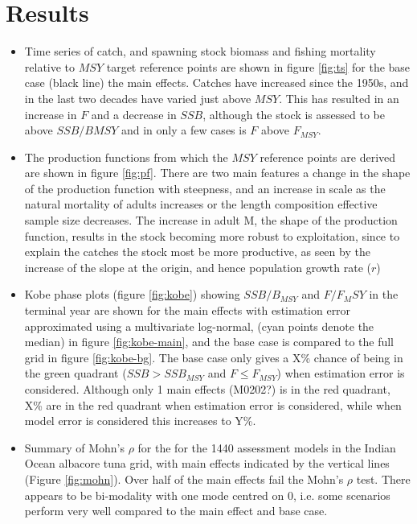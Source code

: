 \section*{Results}

\begin{itemize}
   \item Time series of catch, and spawning stock biomass and fishing mortality relative to $MSY$ target reference points are shown in figure \ref{fig:ts} for the base case (black line) the main effects. Catches have increased since the 1950s, and in the last two decades have varied just above $MSY$. This has resulted in an increase in $F$ and a decrease in $SSB$, although the stock is assessed to be above $SSB/B{MSY}$ and in only a few cases is $F$ above $F_{MSY}$.  

   \item The production functions from which the $MSY$ reference points are derived are shown in figure \ref{fig:pf}. There are two main features a change in the shape of the production function with steepness, and an increase in scale as the natural mortality of adults increases or the length composition effective sample size decreases. The increase in adult M, the shape of the production function, results in the stock becoming more robust to exploitation, since to explain the catches the stock most be more productive, as seen by the increase of the slope at the origin, and hence population growth rate ($r$)  

   \item Kobe phase plots (figure \ref{fig:kobe}) showing $SSB/B_{MSY}$ and $F/F_MSY$ in the terminal year are shown for the main effects with estimation error approximated using a multivariate log-normal, (cyan points denote the median) in figure \ref{fig:kobe-main}, and the base case is compared to the full grid in figure \ref{fig:kobe-bg}. The base case only gives a X\% chance of being in the green quadrant ($SSB \gt SSB_{MSY}$ and $F \le F_{MSY}$) when estimation error is considered. Although only 1 main effects (M0202?) is in the red quadrant, X\% are in the red quadrant when estimation error is considered, while when model error is considered this increases to Y\%. 
   
   \item Summary of Mohn's $\rho$ for the for the 1440 assessment models in the Indian Ocean albacore tuna grid, with main effects indicated by the vertical lines (Figure \ref{fig:mohn}). Over half of the main effects fail the Mohn's $\rho$ test. There appears to be bi-modality with one mode centred on 0, i.e. some scenarios perform very well compared to the main effect and base case.
   

\end{itemize}
